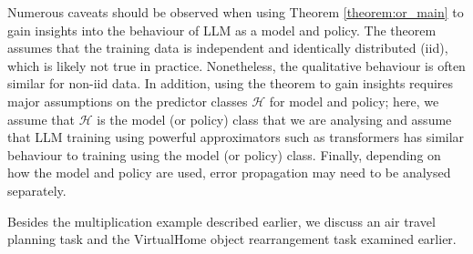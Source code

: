 {Numerous caveats should be observed when using Theorem \ref{theorem:or_main} to gain insights into the behaviour of LLM as a model and policy. The theorem assumes that the training data is independent and identically distributed (iid), which is likely not true in practice. Nonetheless, the qualitative behaviour is often similar for non-iid data. 
In addition, using the theorem to gain insights requires major assumptions on the predictor classes $\mathcal{H}$ for model and policy; here, we assume that $\mathcal{H}$ is the model (or policy) class that we are analysing and assume that LLM training using powerful approximators such as transformers has similar behaviour to training using the model (or policy) class. Finally, depending on how the model and policy are used, error propagation may need to be analysed separately. 

Besides the multiplication example described earlier, we discuss an air travel planning task and the VirtualHome object rearrangement task examined earlier.



}
